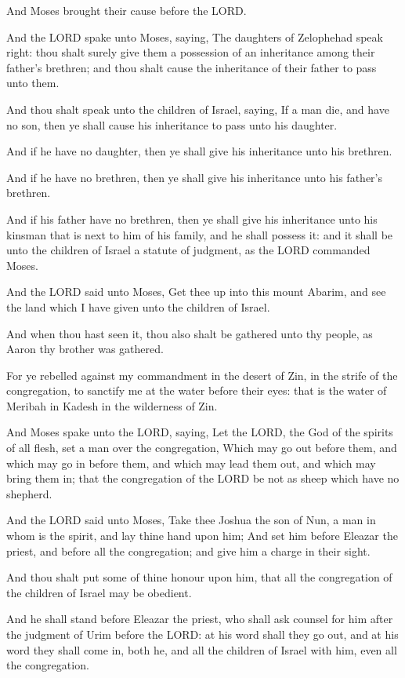\verse And Moses brought their cause before the LORD.

\verse And the LORD spake unto Moses, saying, \verse The daughters of
Zelophehad speak right: thou shalt surely give them a possession of an
inheritance among their father's brethren; and thou shalt cause the
inheritance of their father to pass unto them.

\verse And thou shalt speak unto the children of Israel, saying, If a
man die, and have no son, then ye shall cause his inheritance to pass
unto his daughter.

\verse And if he have no daughter, then ye shall give his inheritance
unto his brethren.

\verse And if he have no brethren, then ye shall give his inheritance
unto his father's brethren.

\verse And if his father have no brethren, then ye shall give his
inheritance unto his kinsman that is next to him of his family, and he
shall possess it: and it shall be unto the children of Israel a
statute of judgment, as the LORD commanded Moses.

\verse And the LORD said unto Moses, Get thee up into this mount
Abarim, and see the land which I have given unto the children of
Israel.

\verse And when thou hast seen it, thou also shalt be gathered unto thy
people, as Aaron thy brother was gathered.

\verse For ye rebelled against my commandment in the desert of Zin, in
the strife of the congregation, to sanctify me at the water before
their eyes: that is the water of Meribah in Kadesh in the wilderness
of Zin.

\verse And Moses spake unto the LORD, saying, \verse Let the LORD, the
God of the spirits of all flesh, set a man over the congregation,
\verse Which may go out before them, and which may go in before them,
and which may lead them out, and which may bring them in; that the
congregation of the LORD be not as sheep which have no shepherd.

\verse And the LORD said unto Moses, Take thee Joshua the son of Nun, a
man in whom is the spirit, and lay thine hand upon him; \verse And set
him before Eleazar the priest, and before all the congregation; and
give him a charge in their sight.

\verse And thou shalt put some of thine honour upon him, that all the
congregation of the children of Israel may be obedient.

\verse And he shall stand before Eleazar the priest, who shall ask
counsel for him after the judgment of Urim before the LORD: at his
word shall they go out, and at his word they shall come in, both he,
and all the children of Israel with him, even all the congregation.

